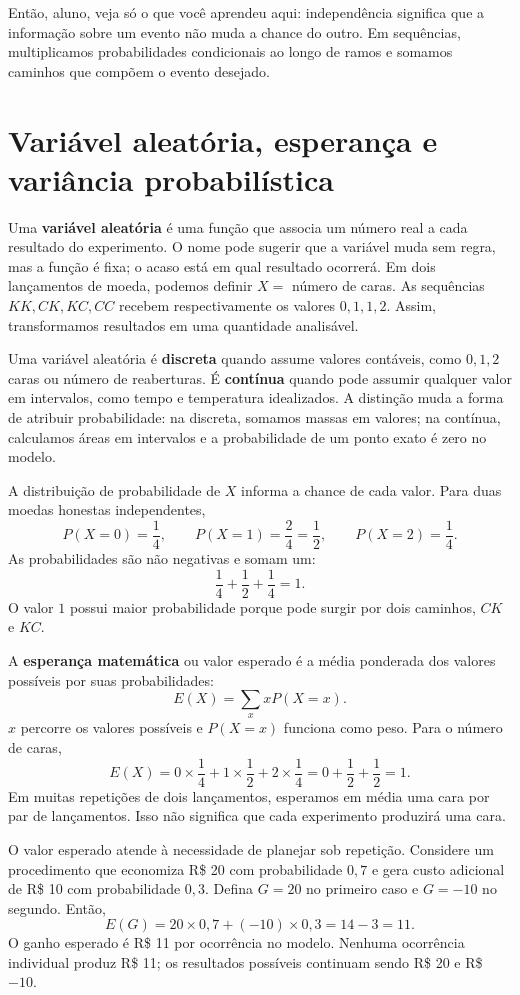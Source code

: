 \begin{SummaryBox}
Então, aluno, veja só o que você aprendeu aqui: independência significa que a informação sobre um evento não muda a chance do outro. Em sequências, multiplicamos probabilidades condicionais ao longo de ramos e somamos caminhos que compõem o evento desejado.
\end{SummaryBox}

\section{Variável aleatória, esperança e variância probabilística}

Uma \textbf{variável aleatória} é uma função que associa um número real a cada resultado do experimento. O nome pode sugerir que a variável muda sem regra, mas a função é fixa; o acaso está em qual resultado ocorrerá. Em dois lançamentos de moeda, podemos definir $X=$ número de caras. As sequências $KK,CK,KC,CC$ recebem respectivamente os valores $0,1,1,2$. Assim, transformamos resultados em uma quantidade analisável.

Uma variável aleatória é \textbf{discreta} quando assume valores contáveis, como $0,1,2$ caras ou número de reaberturas. É \textbf{contínua} quando pode assumir qualquer valor em intervalos, como tempo e temperatura idealizados. A distinção muda a forma de atribuir probabilidade: na discreta, somamos massas em valores; na contínua, calculamos áreas em intervalos e a probabilidade de um ponto exato é zero no modelo.

A distribuição de probabilidade de $X$ informa a chance de cada valor. Para duas moedas honestas independentes,
\[
P(X=0)=\frac14,\qquad P(X=1)=\frac24=\frac12,\qquad P(X=2)=\frac14.
\]
As probabilidades são não negativas e somam um:
\[
\frac14+\frac12+\frac14=1.
\]
O valor $1$ possui maior probabilidade porque pode surgir por dois caminhos, $CK$ e $KC$.

A \textbf{esperança matemática} ou valor esperado é a média ponderada dos valores possíveis por suas probabilidades:
\[
E(X)=\sum_x xP(X=x).
\]
$x$ percorre os valores possíveis e $P(X=x)$ funciona como peso. Para o número de caras,
\[
E(X)=0\times\frac14+1\times\frac12+2\times\frac14
=0+\frac12+\frac12=1.
\]
Em muitas repetições de dois lançamentos, esperamos em média uma cara por par de lançamentos. Isso não significa que cada experimento produzirá uma cara.

O valor esperado atende à necessidade de planejar sob repetição. Considere um procedimento que economiza R\$ 20 com probabilidade $0{,}7$ e gera custo adicional de R\$ 10 com probabilidade $0{,}3$. Defina $G=20$ no primeiro caso e $G=-10$ no segundo. Então,
\[
E(G)=20\times0{,}7+(-10)\times0{,}3=14-3=11.
\]
O ganho esperado é R\$ 11 por ocorrência no modelo. Nenhuma ocorrência individual produz R\$ 11; os resultados possíveis continuam sendo R\$ 20 e R\$ $-10$.

